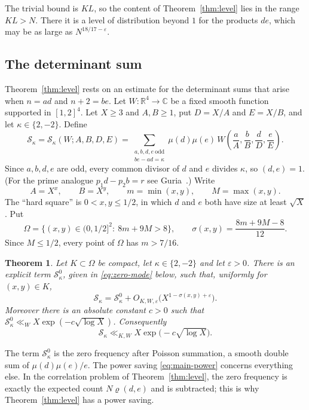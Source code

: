 \documentclass[11pt]{amsart}
\newtheorem{theorem}{Theorem}[section]
\theoremstyle{definition}
\theoremstyle{remark}
\numberwithin{equation}{section}
\newcommand{\R}{\mathbb R}
\newcommand{\C}{\mathbb C}
\newcommand{\cS}{\mathcal S}
\newcommand{\eps}{\varepsilon}
\begin{document}
The trivial bound is $KL$, so the content of Theorem~\ref{thm:level} lies
in the range $KL>N$.  There it is a level of distribution beyond $1$ for the
products $de$, which may be as large as $N^{18/17-\eps}$.

\subsection{The determinant sum}
Theorem~\ref{thm:level} rests on an estimate for the determinant sums that
arise when $n=ad$ and $n+2=be$.  Let $W\colon\R^4\to\C$ be a fixed smooth
function supported in $[1,2]^4$.  Let $X\ge 3$ and $A,B\ge 1$, put $D=X/A$
and $E=X/B$, and let $\kappa\in\{2,-2\}$.  Define
\begin{equation}\label{eq:S}
 \cS_\kappa=\cS_\kappa(W;A,B,D,E)
 =\sum_{\substack{a,b,d,e\ \mathrm{odd}\\ be-ad=\kappa}}
 \mu(d)\mu(e)\,
 W\!\left(\frac aA,\frac bB,\frac dD,\frac eE\right).
\end{equation}
Since $a,b,d,e$ are odd, every common divisor of $d$ and $e$ divides
$\kappa$, so $(d,e)=1$.  (For the prime analogue $p_1d-p_2b=r$ see
Guria~\cite{Gur}.)  Write
\begin{equation}\label{eq:xy}
 A=X^{x},\qquad B=X^{y},\qquad m=\min(x,y),\qquad M=\max(x,y).
\end{equation}
The ``hard square'' is $0<x,y\le 1/2$, in which $d$ and $e$ both have size
at least $\sqrt X$.  Put
\[
 \Omega=\bigl\{(x,y)\in(0,1/2]^2:\ 8m+9M>8\bigr\},
 \qquad
 \sigma(x,y)=\frac{8m+9M-8}{12}.
\]
Since $M\le1/2$, every point of $\Omega$ has $m>7/16$.

\begin{theorem}\label{thm:main}
Let $K\subset\Omega$ be compact, let $\kappa\in\{2,-2\}$ and let $\eps>0$.
There is an explicit term $\cS_\kappa^{0}$, given in
\eqref{eq:zero-mode} below, such that, uniformly for $(x,y)\in K$,
\begin{equation}\label{eq:main-power}
 \cS_\kappa=\cS_\kappa^{0}
 +O_{K,W,\eps}\bigl(X^{1-\sigma(x,y)+\eps}\bigr).
\end{equation}
Moreover there is an absolute constant $c>0$ such that
$\cS_\kappa^{0}\ll_{W}X\exp(-c\sqrt{\log X})$.  Consequently
\begin{equation}\label{eq:main-log}
 \cS_\kappa\ll_{K,W}X\exp\bigl(-c\sqrt{\log X}\bigr).
\end{equation}
\end{theorem}

The term $\cS_\kappa^0$ is the zero frequency after Poisson summation, a
smooth double sum of $\mu(d)\mu(e)/e$.  The power saving
\eqref{eq:main-power} concerns everything else.  In the correlation problem
of Theorem~\ref{thm:level}, the zero frequency is exactly the expected count
$N\varrho(d,e)$ and is subtracted; this is why Theorem~\ref{thm:level} has a
power saving.
\end{document}
